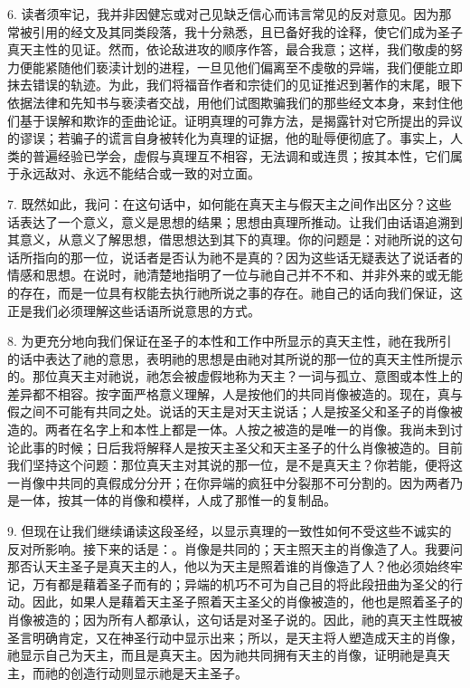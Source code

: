 6. 读者须牢记，我并非因健忘或对己见缺乏信心而讳言常见的反对意见。因为那常被引用的经文及其同类段落，我十分熟悉，且已备好我的诠释，使它们成为圣子真天主性的见证。然而，依论敌进攻的顺序作答，最合我意；这样，我们敬虔的努力便能紧随他们亵渎计划的进程，一旦见他们偏离至不虔敬的异端，我们便能立即抹去错误的轨迹。为此，我们将福音作者和宗徒们的见证推迟到著作的末尾，眼下依据法律和先知书与亵渎者交战，用他们试图欺骗我们的那些经文本身，来封住他们基于误解和欺诈的歪曲论证。证明真理的可靠方法，是揭露针对它所提出的异议的谬误；若骗子的谎言自身被转化为真理的证据，他的耻辱便彻底了。事实上，人类的普遍经验已学会，虚假与真理互不相容，无法调和或连贯；按其本性，它们属于永远敌对、永远不能结合或一致的对立面。\par

7. 既然如此，我问：在这句话中，如何能在真天主与假天主之间作出区分？这些话表达了一个意义，意义是思想的结果；思想由真理所推动。让我们由话语追溯到其意义，从意义了解思想，借思想达到其下的真理。你的问题是：对祂所说的这句话所指向的那一位，说话者是否认为祂不是真的？因为这些话无疑表达了说话者的情感和思想。在说时，祂清楚地指明了一位与祂自己并不不和、并非外来的或无能的存在，而是一位具有权能去执行祂所说之事的存在。祂自己的话向我们保证，这正是我们必须理解这些话语所说意思的方式。\par

8. 为更充分地向我们保证在圣子的本性和工作中所显示的真天主性，祂在我所引的话中表达了祂的意思，表明祂的思想是由祂对其所说的那一位的真天主性所提示的。那位真天主对祂说，祂怎会被虚假地称为天主？一词与孤立、意图或本性上的差异都不相容。按字面严格意义理解，人是按他们的共同肖像被造的。现在，真与假之间不可能有共同之处。说话的天主是对天主说话；人是按圣父和圣子的肖像被造的。两者在名字上和本性上都是一体。人按之被造的是唯一的肖像。我尚未到讨论此事的时候；日后我将解释人是按天主圣父和天主圣子的什么肖像被造的。目前我们坚持这个问题：那位真天主对其说的那一位，是不是真天主？你若能，便将这一肖像中共同的真假成分分开；在你异端的疯狂中分裂那不可分割的。因为两者乃是一体，按其一体的肖像和模样，人成了那惟一的复制品。\par

9. 但现在让我们继续诵读这段圣经，以显示真理的一致性如何不受这些不诚实的反对所影响。接下来的话是：。肖像是共同的；天主照天主的肖像造了人。我要问那否认天主圣子是真天主的人，他以为天主是照着谁的肖像造了人？他必须始终牢记，万有都是藉着圣子而有的；异端的机巧不可为自己目的将此段扭曲为圣父的行动。因此，如果人是藉着天主圣子照着天主圣父的肖像被造的，他也是照着圣子的肖像被造的；因为所有人都承认，这句话是对圣子说的。因此，祂的真天主性既被圣言明确肯定，又在神圣行动中显示出来；所以，是天主将人塑造成天主的肖像，祂显示自己为天主，而且是真天主。因为祂共同拥有天主的肖像，证明祂是真天主，而祂的创造行动则显示祂是天主圣子。\par

